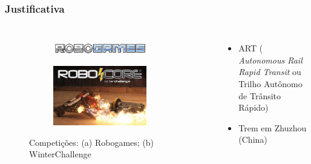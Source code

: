 \begin{frame}
\frametitle{Justificativa}
\begin{columns}[c]

	\begin{figure}[h]
     \centering
     \captionsetup{width=0.85\textwidth,font=footnotesize,textfont=bf}
     \begin{subfigure}[b]{\textwidth}
 	\centering
         \includegraphics[width=0.85\textwidth,height=\textheight,keepaspectratio]{Figuras/robogames.jpg}
         \caption{\centering \label{fig:fss}}
     \end{subfigure}
     
     \begin{subfigure}[b]{\textwidth}
 	\centering
         \includegraphics[width=0.85\textwidth,height=5\textheight,keepaspectratio]{Figuras/winterlogo.jpg}
         \caption{\centering \label{fig:vdd}}
     \end{subfigure}
	\caption{Competições: (a) Robogames; (b) WinterChallenge}
 \end{figure}
	\pause
	\begin{itemize}
	\item ART (\textit{ Autonomous Rail Rapid Transit} ou Trilho Autônomo de Trânsito 	Rápido)
	\item Trem em Zhuzhou (China)
	\end{itemize}


\end{columns}
\end{frame}
